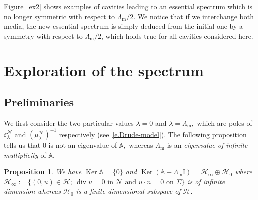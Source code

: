 \documentclass[10pt]{amsart}
\newtheorem{prop}[cdrthm]{Proposition}
\theoremstyle{definition}
\DeclareMathOperator{\Div}{div}
\DeclareMathOperator{\Ker}{Ker}
\newcommand{\epsl}{\varepsilon}
\newcommand{\calH}{\mathcal{H}}
\newcommand{\calN}{\mathcal{N}}
\newcommand{\bbA}{\mathbb{A}}
\newcommand{\Ident}{{\mathrm{I}}}
\newcommand{\Lm}{{\Lambda_{\mathrm{m}}}}
\begin{document}
Figure~\ref{ex2} shows examples of cavities leading to an essential spectrum which is no longer symmetric with respect to $\Lm/2$. We notice that if we interchange both media, the new essential spectrum is simply deduced from the initial one by a symmetry with respect to $\Lm/2$, which holds true for all cavities considered here.


\section{Exploration of the spectrum}\label{s-investigation}

\subsection{Preliminaries}\label{s-prelimin}

We first consider the two particular values $\lambda = 0$ and $\lambda = \Lm,$ which are poles of $\epsl_\lambda^\calN$ and $(\mu_\lambda^\calN)^{-1}$ respectively (see~\eqref{e.Drude-model}). The following proposition tells us that $0$ is not an eigenvalue of $\bbA,$ whereas $\Lm$ is an \emph{eigenvalue of infinite multiplicity} of $\bbA.$

\begin{prop}\label{p.partic-values}
We have $\Ker \bbA = \{0\}$ and $\Ker(\bbA - \Lm\Ident) = \calH_\infty \oplus \calH_0$ where $\calH_\infty := \big\{(0,u) \in \calH;\ \Div u = 0 \text{ in }\calN \text{ and } u \cdot n = 0 \text{ on }\Sigma \big\}$ is of infinite dimension whereas $\calH_0$ is a finite dimensional subspace of $\calH.$
\end{prop}
\end{document}
